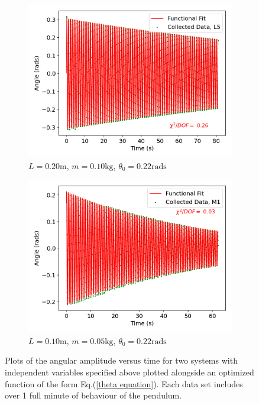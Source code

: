 \begin{figure}[H]
\centering
\begin{subfigure}[t]{0.5\textwidth}
  \centering
  \includegraphics[width=1\textwidth]{Plots/L5.png}
  \caption{\small{$L = 0.20\text{m}$, $m = 0.10\text{kg}$, $\theta_0 = 0.22\text{rads}$}}
  \label{L5}
\end{subfigure}%
\begin{subfigure}[t]{.5\textwidth}
  \centering
  \includegraphics[width=\textwidth]{Plots/M1.png}
  \caption{\small{$L = 0.10\text{m}$, $m = 0.05\text{kg}$, $\theta_0 = 0.22\text{rads}$}}
  \label{M1}
\end{subfigure}
\caption{\small{Plots of the angular amplitude versus time for two systems with independent variables specified above plotted alongside an optimized function of the form Eq.(\ref{theta equation}). Each data set includes over 1 full minute of behaviour of the pendulum.}}
\end{figure}

